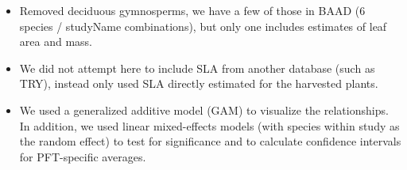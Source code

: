 \documentclass[a4paper]{article}
\begin{document}
\begin{itemize}
  \item Removed deciduous gymnosperms, we have a few of those in BAAD (6 species / studyName combinations), but only one includes estimates of leaf area and mass. 
  \item We did not attempt here to include SLA from another database (such as TRY), instead only used SLA directly estimated for the harvested plants.
  \item We used a generalized additive model (GAM) to visualize the relationships. In addition, we used linear mixed-effects models (with species within study as the random effect) to test for significance and to calculate confidence intervals for PFT-specific averages.
\end{itemize}





\end{document}
